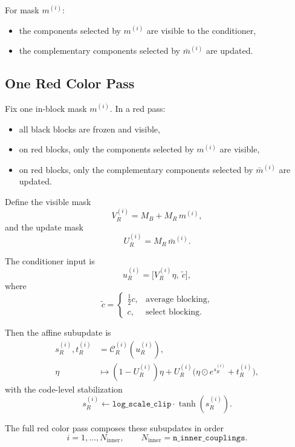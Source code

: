 \documentclass[11pt]{article}
\begin{document}
For mask $m^{(i)}$:
\begin{itemize}
\item the components selected by $m^{(i)}$ are visible to the conditioner,
\item the complementary components selected by $\bar m^{(i)}$ are updated.
\end{itemize}

\subsection{One Red Color Pass}

Fix one in-block mask $m^{(i)}$. In a red pass:
\begin{itemize}
\item all black blocks are frozen and visible,
\item on red blocks, only the components selected by $m^{(i)}$ are visible,
\item on red blocks, only the complementary components selected by
$\bar m^{(i)}$ are updated.
\end{itemize}

Define the visible mask
\begin{equation}
V_R^{(i)} = M_B + M_R\,m^{(i)},
\end{equation}
and the update mask
\begin{equation}
U_R^{(i)} = M_R\,\bar m^{(i)}.
\end{equation}

The conditioner input is
\begin{equation}
u_R^{(i)} = \bigl[V_R^{(i)}\eta,\ \tilde c\bigr],
\end{equation}
where
\[
\tilde c =
\begin{cases}
\tfrac12 c,& \text{average blocking,}\\
c,& \text{select blocking.}
\end{cases}
\]

Then the affine subupdate is
\begin{align}
s_R^{(i)},t_R^{(i)} &= \mathcal C_R^{(i)}(u_R^{(i)}), \\
\eta &\mapsto (1-U_R^{(i)})\eta
+ U_R^{(i)}\bigl(\eta\odot e^{s_R^{(i)}} + t_R^{(i)}\bigr),
\end{align}
with the code-level stabilization
\[
s_R^{(i)} \leftarrow \texttt{log\_scale\_clip}\cdot \tanh(s_R^{(i)}).
\]

The full red color pass composes these subupdates in order
\[
i=1,\dots,N_{\mathrm{inner}},
\qquad
N_{\mathrm{inner}}=\texttt{n\_inner\_couplings}.
\]
\end{document}
